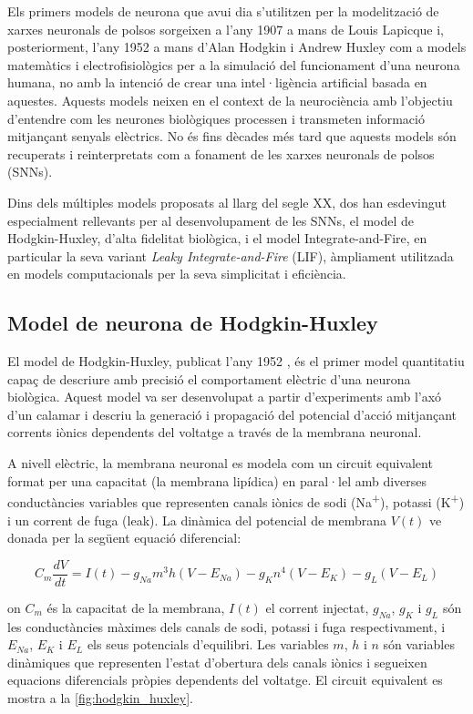 \documentclass[a4paper,11pt, titlepage, twoside]{article}
\begin{document}
Els primers models de neurona que avui dia s'utilitzen per la modelització de xarxes neuronals de polsos sorgeixen a l'any 1907 a mans de Louis Lapicque i, posteriorment, l'any 1952 a mans d'Alan Hodgkin i Andrew Huxley com a models matemàtics i electrofisiològics per a la simulació del funcionament d'una neurona humana, no amb la intenció de crear una intel·ligència artificial basada en aquestes. Aquests models neixen en el context de la neurociència amb l'objectiu d'entendre com les neurones biològiques processen i transmeten informació mitjançant senyals elèctrics. No és fins dècades més tard que aquests models són recuperats i reinterpretats com a fonament de les xarxes neuronals de polsos (SNNs).

Dins dels múltiples models proposats al llarg del segle XX, dos han esdevingut especialment rellevants per al desenvolupament de les SNNs, el model de Hodgkin-Huxley, d'alta fidelitat biològica, i el model Integrate-and-Fire, en particular la seva variant \textit{Leaky Integrate-and-Fire} (LIF), àmpliament utilitzada en models computacionals per la seva simplicitat i eficiència.

\subsection{Model de neurona de Hodgkin-Huxley}

El model de Hodgkin-Huxley, publicat l'any 1952 \cite{hodgkin1952}, és el primer model quantitatiu capaç de descriure amb precisió el comportament elèctric d'una neurona biològica. Aquest model va ser desenvolupat a partir d'experiments amb l'axó d'un calamar i descriu la generació i propagació del potencial d'acció mitjançant corrents iònics dependents del voltatge a través de la membrana neuronal.

A nivell elèctric, la membrana neuronal es modela com un circuit equivalent format per una capacitat (la membrana lipídica) en paral·lel amb diverses conductàncies variables que representen canals iònics de sodi (Na\textsuperscript{+}), potassi (K\textsuperscript{+}) i un corrent de fuga (leak). La dinàmica del potencial de membrana $V(t)$ ve donada per la següent equació diferencial:

\begin{equation}
	C_m \frac{dV}{dt} = I(t) - g_{Na} m^3 h (V - E_{Na}) - g_K n^4 (V - E_K) - g_L (V - E_L)
\end{equation}

on $C_m$ és la capacitat de la membrana, $I(t)$ el corrent injectat, $g_{Na}$, $g_K$ i $g_L$ són les conductàncies màximes dels canals de sodi, potassi i fuga respectivament, i $E_{Na}$, $E_K$ i $E_L$ els seus potencials d'equilibri. Les variables $m$, $h$ i $n$ són variables dinàmiques que representen l'estat d'obertura dels canals iònics i segueixen equacions diferencials pròpies dependents del voltatge. El circuit equivalent es mostra a la \autoref{fig:hodgkin_huxley}.
\end{document}
